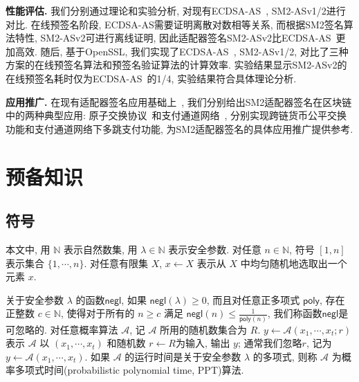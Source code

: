 \documentclass[review]{jcr}
\begin{document}
\begin{trivlist}
\item \textbf{性能评估.} 我们分别通过理论和实验分析, 对现有ECDSA-AS~\cite{PA18,AumayrEEFHMMR20}, SM2-ASv1/2进行对比. 在线预签名阶段, ECDSA-AS需要证明离散对数相等关系, 
而根据SM2签名算法特性, SM2-ASv2可进行离线证明, 因此适配器签名SM2-ASv2比ECDSA-AS~\cite{PA18,AumayrEEFHMMR20}更加高效. 随后, 基于OpenSSL, 我们实现了ECDSA-AS~\cite{AumayrEEFHMMR20}, SM2-ASv1/2, 对比了三种方案的在线预签名算法和预签名验证算法的计算效率.  实验结果显示SM2-ASv2的在线预签名耗时仅为ECDSA-AS~\cite{AumayrEEFHMMR20}的1/4, 实验结果符合具体理论分析.
\end{trivlist}

\begin{trivlist}
\item \textbf{应用推广.} 
在现有适配器签名应用基础上~\cite{Poelstra2017,MalavoltaMSKM19,EsginEE20,AumayrEEFHMMR20}, 我们分别给出SM2适配器签名在区块链中的两种典型应用: 原子交换协议~\cite{Nolan2013,Poelstra2017,DeshpandeH20,Gugger20}和支付通道网络~\cite{DeckerW15,PC2018,AumayrEEFHMMR20}, 分别实现跨链货币公平交换功能和支付通道网络下多跳支付功能, 为SM2适配器签名的具体应用推广提供参考. 
\end{trivlist}

\section{预备知识} 

\subsection{符号}

本文中, 用 $\mathbb{N}$ 表示自然数集, 用 $\lambda\in \mathbb{N}$ 表示安全参数. 对任意 $n \in \mathbb{N}$, 符号 $[1,n]$ 表示集合 $\{1,\cdots,n\}$. 对任意有限集 $X$, $x \leftarrow X$ 表示从 $X$ 中均匀随机地选取出一个元素 $x$. 

关于安全参数 $\lambda$ 的函数$\mathsf{negl}$, 如果 $\mathsf{negl}(\lambda) \geq 0$, 而且对任意正多项式 $\mathsf{poly}$, 存在正整数 $c \in \mathbb{N}$, 使得对于所有的 $n \geq c$ 满足 $\mathsf{negl}(n) \leq \frac{1}{\mathsf{poly}(n)}$, 我们称函数$\mathsf{negl}$是可忽略的.   
对任意概率算法 $\mathcal{A}$, 记 $\mathcal{A}$ 所用的随机数集合为 $R$. $y \leftarrow \mathcal{A}(x_1,\cdots,x_t;r)$ 表示 $\mathcal{A}$ 以 $(x_1, \cdots, x_t)$ 和随机数 $r\leftarrow R$为输入, 输出 $y$; 通常我们忽略$r$, 记为 $y \leftarrow \mathcal{A}(x_1,\cdots,x_t)$. 如果 $\mathcal{A}$ 的运行时间是关于安全参数 $\lambda$ 的多项式, 则称 $\mathcal{A}$ 为概率多项式时间(probabilistic polynomial time, PPT)算法. 
\end{document}
